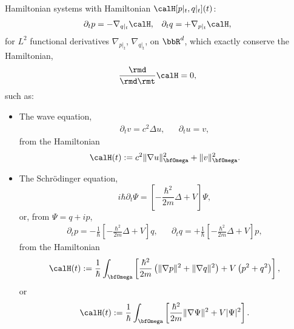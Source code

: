     \begin{example}
        Hamiltonian systems with Hamiltonian $\calH[p|_{t}, q|_{t}](t)$:
        \begin{align}
            \partial_{t}p  =  - \nabla_{q|_{t}}\calH,  &&
            \partial_{t}q  =  + \nabla_{p|_{t}}\calH,
        \end{align}
        for $L^{2}$ functional derivatives $\nabla_{p|_{t}}$, $\nabla_{q|_{t}}$, on $\bbR^{d}$, which exactly conserve the Hamiltonian,
        \begin{equation}
            \frac{\rmd}{\rmd\rmt}\calH  =  0,
        \end{equation}
        such as:
        \begin{itemize}
            \item  The wave equation,
            \begin{align}
                \partial_{t}v  =  c^{2}\Delta u,  &&
                \partial_{t}u  =  v,
            \end{align}
            from the Hamiltonian
            \begin{equation}
                \calH(t)  :=  c^{2}\|\nabla u\|_{\bfOmega}^{2} + \|v\|_{\bfOmega}^{2}.
            \end{equation}
            \item  The Schrödinger equation,
            \begin{equation}
                i\hbar\partial_{t}\Psi  =  \left[- \frac{\hbar^{2}}{2m}\Delta + V\right]\Psi,
            \end{equation}
            or, from $\Psi  =  q + ip$,
            \begin{align}
                \partial_{t}p  =  - \frac{1}{\hbar}\left[- \frac{\hbar^{2}}{2m}\Delta + V\right]q,  &&
                \partial_{t}q  =  + \frac{1}{\hbar}\left[- \frac{\hbar^{2}}{2m}\Delta + V\right]p,
            \end{align}
            from the Hamiltonian
            \begin{equation}
                \calH(t)  :=  \frac{1}{\hbar}\int_{\bfOmega}\left[\frac{\hbar^{2}}{2m}\left(\|\nabla p\|^{2} + \|\nabla q\|^{2}\right) + V\left(p^{2} + q^{2}\right)\right],
            \end{equation}
            or
            \begin{equation}
                \calH(t)  :=  \frac{1}{\hbar}\int_{\bfOmega}\left[\frac{\hbar^{2}}{2m}\|\nabla\Psi\|^{2} + V|\Psi|^{2}\right].
            \end{equation}
        \end{itemize}
    \end{example}
    \line
    
